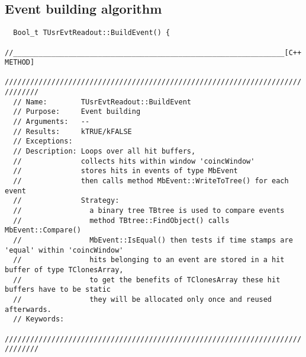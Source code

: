 \documentclass[10pt]{article}
\newenvironment{yellowboxed}
	{\begin{Sbox}\begin{minipage}[t]}
	{\end{minipage}\end{Sbox}\colorbox{yellow}{\TheSbox}}
\begin{document}
\subsection{Event building algorithm}\label{EventBuildingAlgorithm}
\begin{center}
\begin{table}[H]
{\scriptsize
\begin{yellowboxed}{\linewidth}
\verb+  Bool_t TUsrEvtReadout::BuildEvent() {+\\
\verb-  //________________________________________________________________[C++ METHOD]-\\
\verb+  //////////////////////////////////////////////////////////////////////////////+\\
\verb+  // Name:        TUsrEvtReadout::BuildEvent+\\
\verb+  // Purpose:     Event building+\\
\verb+  // Arguments:   --+\\
\verb+  // Results:     kTRUE/kFALSE+\\
\verb+  // Exceptions:  +\\
\verb+  // Description: Loops over all hit buffers,+\\
\verb+  //              collects hits within window 'coincWindow'+\\
\verb+  //              stores hits in events of type MbEvent+\\
\verb+  //              then calls method MbEvent::WriteToTree() for each event+\\
\verb+  //              Strategy:+\\
\verb+  //                a binary tree TBtree is used to compare events+\\
\verb+  //                method TBtree::FindObject() calls MbEvent::Compare()+\\
\verb+  //                MbEvent::IsEqual() then tests if time stamps are 'equal' within 'coincWindow'+\\
\verb+  //                hits belonging to an event are stored in a hit buffer of type TClonesArray,+\\
\verb+  //                to get the benefits of TClonesArray these hit buffers have to be static+\\
\verb+  //                they will be allocated only once and reused afterwards. +\\
\verb+  // Keywords:     +\\
\verb+  //////////////////////////////////////////////////////////////////////////////+\\

\end{yellowboxed}}
\end{table}
\end{center}
\end{document}
